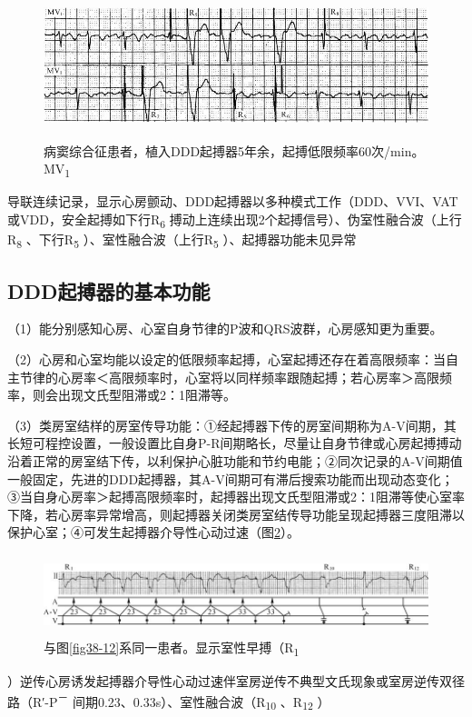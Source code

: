 \begin{figure}[!htbp]
 \centering
 \includegraphics[width=5.58333in,height=1.67708in]{./images/Image00629.jpg}
 \captionsetup{justification=centering}
 \caption{病窦综合征患者，植入DDD起搏器5年余，起搏低限频率60次/min。MV\textsubscript{1}}
 \label{fig38-26}
  \end{figure} 
导联连续记录，显示心房颤动、DDD起搏器以多种模式工作（DDD、VVI、VAT或VDD，安全起搏如下行R\textsubscript{6}
搏动上连续出现2个起搏信号）、伪室性融合波（上行R\textsubscript{8}
、下行R\textsubscript{5} ）、室性融合波（上行R\textsubscript{5}
）、起搏器功能未见异常

\protect\hypertarget{text00045.htmlux5cux23subid495}{}{}

\subsection{DDD起搏器的基本功能}

（1）能分别感知心房、心室自身节律的P波和QRS波群，心房感知更为重要。

（2）心房和心室均能以设定的低限频率起搏，心室起搏还存在着高限频率：当自主节律的心房率＜高限频率时，心室将以同样频率跟随起搏；若心房率＞高限频率，则会出现文氏型阻滞或2：1阻滞等。

（3）类房室结样的房室传导功能：①经起搏器下传的房室间期称为A-V间期，其长短可程控设置，一般设置比自身P-R间期略长，尽量让自身节律或心房起搏搏动沿着正常的房室结下传，以利保护心脏功能和节约电能；②同次记录的A-V间期值一般固定，先进的DDD起搏器，其A-V间期可有滞后搜索功能而出现动态变化；③当自身心房率＞起搏高限频率时，起搏器出现文氏型阻滞或2：1阻滞等使心室率下降，若心房率异常增高，则起搏器关闭类房室结传导功能呈现起搏器三度阻滞以保护心室；④可发生起搏器介导性心动过速（图\ref{fig38-27}）。

\begin{figure}[!htbp]
 \centering
 \includegraphics[width=5.80208in,height=0.92708in]{./images/Image00630.jpg}
 \captionsetup{justification=centering}
 \caption{与图\ref{fig38-12}系同一患者。显示室性早搏（R\textsubscript{1}}
 \label{fig38-27}
  \end{figure} 
）逆传心房诱发起搏器介导性心动过速伴室房逆传不典型文氏现象或室房逆传双径路（R′-P\textsuperscript{－}
间期0.23、0.33s）、室性融合波（R\textsubscript{10} 、R\textsubscript{12}
）

